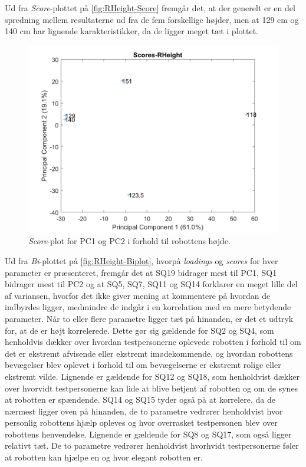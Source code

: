 \noindent
%
Ud fra \textit{Score}-plottet på \autoref{fig:RHeight-Score} fremgår det, at der generelt er en del spredning mellem resultaterne ud fra de fem forskellige højder, men at 129 cm og 140 cm har lignende karakteristikker, da de ligger meget tæt i plottet.
%
\begin{figure}[H]
\centering
\includegraphics[width=\textwidth]{Figure/DatabehandlingSkalaer/PCAfigures/RHeight-Scores}
\caption{\textit{Score}-plot for PC1 og PC2 i forhold til robottens højde.}
\label{fig:RHeight-Score}
\end{figure}
\noindent
%
Ud fra \textit{Bi}-plottet på \autoref{fig:RHeight-Biplot}, hvorpå \textit{loadings} og \textit{scores} for hver parameter er præsenteret, fremgår det at SQ19 bidrager mest til PC1, SQ1 bidrager mest til PC2 og at SQ5, SQ7, SQ11 og SQ14 forklarer en meget lille del af variansen, hvorfor det ikke giver mening at kommentere på hvordan de indbyrdes ligger, medmindre de indgår i en korrelation med en mere betydende parameter. Når to eller flere parametre ligger tæt på hinanden, er det et udtryk for, at de er højt korrelerede. Dette gør sig gældende for SQ2 og SQ4, som henholdvis dækker over hvordan testpersonerne oplevede robotten i forhold til om det er ekstremt afvisende eller ekstremt imødekommende, og hvordan robottens bevægelser blev oplevet i forhold til om bevægelserne er ekstremt rolige eller ekstremt vilde. Lignende er gældende for SQ12 og SQ18, som henholdvist dækker over hvorvidt testpersonerne kan lide at blive betjent af robotten og om de synes at robotten er spændende. SQ14 og SQ15 tyder også på at korrelere, da de nærmest ligger oven på hinanden, de to parametre vedrører henholdvist hvor personlig robottens hjælp opleves og hvor overrasket testpersonen blev over robottens henvendelse. Lignende er gældende for SQ8 og SQ17, som også ligger relativt tæt. De to parametre vedrører henholdvist hvorhvidt testpersonerne føler at robotten kan hjælpe en og hvor elegant robotten er. 

